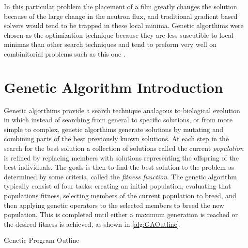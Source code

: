 In this particular problem the placement of a film greatly changes the solution because of the large change in the neutron flux, and traditional gradient based solvers would tend to be trapped in these local minima.
Genetic algorthims were chosen as the optimization technique because they are less suscutible to local minimas than other search techniques and tend to preform very well on combinitorial problems such as this one \cite{Mitchell}.

\section{Genetic Algorithm Introduction}
Genetic algorthims provide a search technique analagous to biological evolution in which instead of searching from general to specific solutions, or from more simple to complex, genetic algorthims generate solutions by mutating and combining parts of the best previously known solutions.
At each step in the search for the best solution a collection of solutions called the current \textit{population} is refined by replacing members with solutions representing the offspring of the best individuals.
The goals is then to find the best solution to the problem as determined by some criteria, called the \textit{fitness function}.
The genetic algorithm typically consist of four tasks: creating an initial population, evaluating that populations fitness, selecting members of the current population to breed, and then applying genetic operators to the selected members to breed the new population. 
This is completed until either a maximum generation is reached or the desired fitness is achieved, as shown in \autoref{alg:GAOutline}.
\begin{algorithm}
  \caption{Genetic Program Outline}
  \label{alg:GAOutline}
  \begin{algorithmic}
      \ENDFOR
      \ENDFOR
    \ENDWHILE
  \end{algorithmic}
\end{algorithm}


